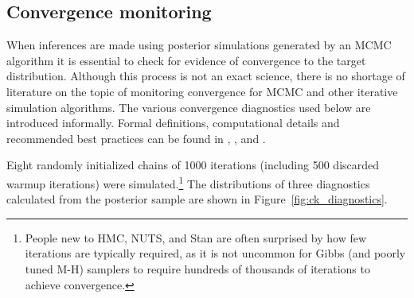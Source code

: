 \subsection{Convergence monitoring}
\label{subsection_convergence}



When inferences are made using posterior simulations generated by an MCMC algorithm it is essential to check for evidence of convergence to the target distribution. Although this process is not an exact science, there is no shortage of literature on the topic of monitoring convergence for MCMC and other iterative simulation algorithms. The various convergence diagnostics used below are introduced informally. Formal definitions, computational details and recommended best practices can be found in , , and .

Eight randomly initialized chains of 1000 iterations (including 500 discarded warmup iterations) were simulated.\footnote{People new to HMC, NUTS, and Stan are often surprised by how few iterations are typically required, as it is not uncommon for Gibbs (and poorly tuned M-H) samplers to require hundreds of thousands of iterations to achieve convergence.} The distributions of three diagnostics calculated from the posterior sample are shown in Figure~\ref{fig:ck_diagnostics}. 

